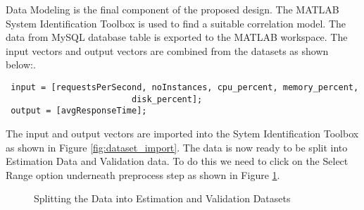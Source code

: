 \documentclass[article,type=msc,colorback,12pt,accentcolor=tud8b,table]{tudthesis}
\begin{document}
 Data Modeling is the final component of the proposed design. The MATLAB System Identification Toolbox is used to find a suitable correlation model. The data from MySQL database table is exported to the MATLAB workspace. The input vectors and output vectors are combined from the datasets as shown below:.   
 \begin{lstlisting} 
 input = [requestsPerSecond, noInstances, cpu_percent, memory_percent, 
						 disk_percent];
 output = [avgResponseTime];
 \end{lstlisting}
  The input and output vectors are imported into the Sytem Identification Toolbox as shown in Figure \ref{fig:dataset_import}. The data is now ready to be split into Estimation Data and Validation data. To do this we need to click on the Select Range option underneath preprocess step as shown in Figure \ref{fig:split_dataset}. 
  
      \begin{figure}[h]
      	\begin{center}
      		\makebox[\textwidth]{\texttt{[image: D7]}}
      	\end{center}
      	\caption{Splitting the Data into Estimation and Validation Datasets}
      	\label{fig:split_dataset}
      \end{figure}
  
\end{document}

